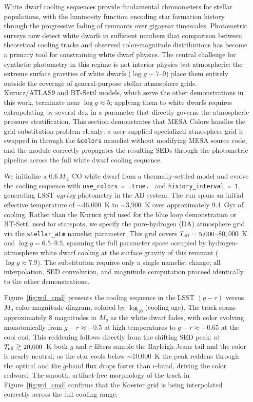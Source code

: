 \documentclass[linenumbers,apj,twocolumn, floatfix]{aastex701}
\begin{document}
White dwarf cooling sequences provide fundamental chronometers for stellar populations, with the luminosity function encoding star formation history through the progressive fading of remnants over gigayear timescales.
Photometric surveys now detect white dwarfs in sufficient numbers that comparison between theoretical cooling tracks and observed color-magnitude distributions has become a primary tool for constraining white dwarf physics.
The central challenge for synthetic photometry in this regime is not interior physics but atmospheric: the extreme surface gravities of white dwarfs ($\log g \sim 7$--9) place them entirely outside the coverage of general-purpose stellar atmosphere grids.
Kurucz/ATLAS9 and BT-Settl models, which serve the other demonstrations in this work, terminate near $\log g \approx 5$; applying them to white dwarfs requires extrapolating by several dex in a parameter that directly governs the atmospheric pressure stratification.
This section demonstrates that MESA Colors handles the grid-substitution problem cleanly: a user-supplied specialized atmosphere grid is swapped in through the \texttt{\&colors} namelist without modifying MESA source code, and the module correctly propagates the resulting SEDs through the photometric pipeline across the full white dwarf cooling sequence.

We initialize a $0.6\,M_\odot$ CO white dwarf from a thermally-settled model and evolve the cooling sequence with \texttt{use\_colors = .true.
}
and \texttt{history\_interval = 1}, generating LSST $ugrizy$ photometry in the AB system.
The run spans an initial effective temperature of $\sim$46{,}000~K to $\sim$3{,}900~K over approximately 9.4~Gyr of cooling.
Rather than the Kurucz grid used for the blue loop demonstration or BT-Settl used for starspots, we specify the \citet{Koester2010} pure-hydrogen (DA) atmosphere grid via the \texttt{stellar\_atm} namelist parameter.
This grid covers $T_{\rm eff} = 5{,}000$--$80{,}000$~K and $\log g = 6.5$--$9.5$, spanning the full parameter space occupied by hydrogen-atmosphere white dwarf cooling at the surface gravity of this remnant ($\log g \approx 7.9$).
The substitution requires only a single namelist change; all interpolation, SED convolution, and magnitude computation proceed identically to the other demonstrations.

Figure~\ref{fig:wd_cmd} presents the cooling sequence in the LSST $(g-r)$ versus $M_g$ color-magnitude diagram, colored by $\log_{10}$(cooling age).
The track spans approximately 8 magnitudes in $M_g$ as the white dwarf fades, with color evolving monotonically from $g-r \approx -0.5$ at high temperatures to $g-r \approx +0.65$ at the cool end.
This reddening follows directly from the shifting SED peak: at $T_{\rm eff} \gtrsim 20{,}000$~K both $g$ and $r$ filters sample the Rayleigh-Jeans tail and the color is nearly neutral; as the star cools below $\sim$10{,}000~K the peak reddens through the optical and the $g$-band flux drops faster than $r$-band, driving the color redward.
The smooth, artifact-free morphology of the track in Figure~\ref{fig:wd_cmd} confirms that the Koester grid is being interpolated correctly across the full cooling range.
\end{document}
